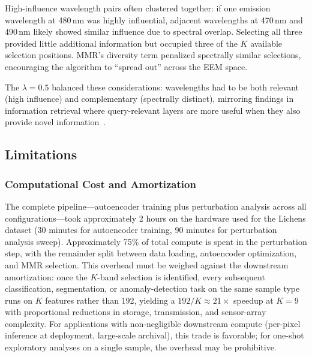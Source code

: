 High-influence wavelength pairs often clustered together: if one emission wavelength at 480\,nm was highly influential, adjacent wavelengths at 470\,nm and 490\,nm likely showed similar influence due to spectral overlap.
Selecting all three provided little additional information but occupied three of the $K$ available selection positions.
MMR's diversity term penalized spectrally similar selections, encouraging the algorithm to ``spread out'' across the EEM space.

The $\lambda = 0.5$ balanced these considerations: wavelengths had to be both relevant (high influence) and complementary (spectrally distinct), mirroring findings in information retrieval where query-relevant layers are more useful when they also provide novel information~\cite{carbonell1998use}.

\subsection{Limitations}
\label{sec:discussion_limitations}


\subsubsection{Computational Cost and Amortization}
The complete pipeline---autoencoder training plus perturbation analysis across all configurations---took approximately 2 hours on the hardware used for the Lichens dataset (30 minutes for autoencoder training, 90 minutes for perturbation analysis sweep).
Approximately 75\% of total compute is spent in the perturbation step, with the remainder split between data loading, autoencoder optimization, and MMR selection.
This overhead must be weighed against the downstream amortization: once the $K$-band selection is identified, every subsequent classification, segmentation, or anomaly-detection task on the same sample type runs on $K$ features rather than 192, yielding a $192/K \approx 21\times$ speedup at $K=9$ with proportional reductions in storage, transmission, and sensor-array complexity.
For applications with non-negligible downstream compute (per-pixel inference at deployment, large-scale archival), this trade is favorable; for one-shot exploratory analyses on a single sample, the overhead may be prohibitive.

